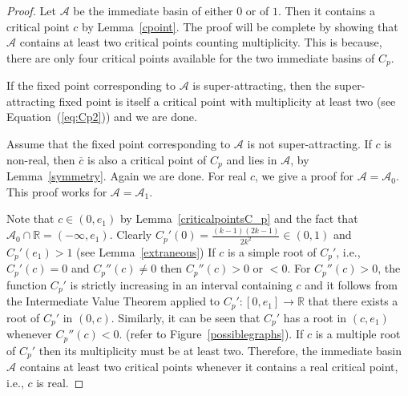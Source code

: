 \documentclass[12pt]{article}
\begin{document}
\begin{proof}
\par
Let $\mathcal{A}$ be  the immediate basin of either $0$ or of $1$. Then it contains a critical point $c$ by Lemma~\ref{cpoint}. The proof will be complete by showing that   $\mathcal{A}$ contains at least two critical points counting multiplicity. This is because, there are only four critical points available for  the two immediate basins of $C_p$. 
\par If the  fixed point corresponding to $\mathcal{A}$ is super-attracting, then the super-attracting fixed point is itself a critical point with multiplicity at least two (see   Equation~(\ref{eq:Cp2})) and we are done.
\par  Assume that the fixed point corresponding to $\mathcal{A}$ is not super-attracting. If $c$ is non-real,  then   $\overline{c}$  is  also a critical point of $C_p$ and lies in $\mathcal{A}$, by Lemma~\ref{symmetry}. Again we are done. For real  $c$, we give a proof for   $\mathcal{A}=\mathcal{A}_0$. This proof works for  $\mathcal{A}=\mathcal{A}_1$.
\par Note that   $c \in (0,e_1)$ by Lemma~\ref{criticalpointsC_p} and the fact that $\mathcal{A}_0 \cap \mathbb{R}=(-\infty, e_1)$.  Clearly  $ C_p'(0)=\frac{(k-1)(2k-1)}{2 k^2} \in (0,1)$ and $ C_p'(e_1)>1$ (see Lemma~\ref{extraneous}) If $c$ is a simple root of $C_p'$, i.e., $C_p'(c)=0$ and $C_p''(c)\neq 0$ then $C_p''(c)>0$ or $<0$. For $C_p''(c)>0$,  the function $C_p'$ is strictly increasing in an interval containing $c$ and it follows from the Intermediate Value Theorem applied to $C_p' : [0,e_1] \to \mathbb{R}$ that  there  exists a  root of $C_p '$ in $(0,c)$. Similarly, it can be seen that $C_p'$ has a root in $ (c, e_1)$ whenever  $C_p ''(c) <0$. (refer to Figure~\ref{possiblegraphs}). If $c$ is a multiple root of $C_p '$ then its multiplicity must be at least two. Therefore, the immediate basin $\mathcal{A}$ contains at least two critical points whenever it contains a real critical point, i.e., $c$ is real.
 
% 
%
\end{proof}
\end{document}
